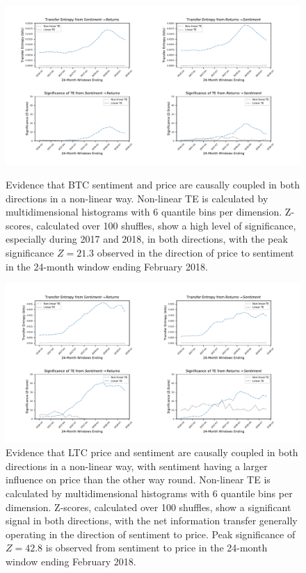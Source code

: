 \documentclass[]{rsos}%
\begin{document}
  \begin{figure}[!htbp]
    \includegraphics[width=\linewidth]{images/BTC.pdf}
    \caption{Evidence that BTC sentiment and price are causally coupled in both directions in a non-linear way. Non-linear TE is calculated by multidimensional histograms with 6 quantile bins per dimension. Z-scores, calculated over 100 shuffles, show a high level of significance, especially during 2017 and 2018, in both directions, with the peak significance $Z=21.3$ observed in the direction of price to sentiment in the 24-month window ending February 2018.}
    \label{fig:BTC_TE}
  
    \includegraphics[width=\linewidth]{images/LTC.pdf} 
    \caption{Evidence that LTC price and sentiment are causally coupled in both directions in a non-linear way, with sentiment having a larger influence on price than the other way round. Non-linear TE is calculated by multidimensional histograms with 6 quantile bins per dimension. Z-scores, calculated over 100 shuffles, show a significant signal in both directions, with the net information transfer generally operating in the direction of sentiment to price. Peak significance of $Z=42.8$ is observed from sentiment to price in the 24-month window ending February 2018.}
    \label{fig:LTC_TE}
    \vspace{-4pt}
  \end{figure}
\end{document}
